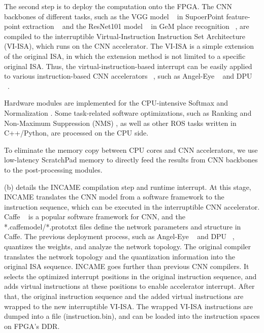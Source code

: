 The second step is to deploy the computation onto the FPGA. 
The CNN backbones of different tasks, such as the VGG model  ~\cite{kim2016accurate} in SupoerPoint feature-point extraction  ~\cite{detone2018superpoint} and the ResNet101 model  ~\cite{he2016deep} in GeM place recognition  ~\cite{radenovic2018fine}, are compiled to the interruptible Virtual-Instruction Instruction Set Architecture (VI-ISA), which runs on the CNN accelerator. The VI-ISA is a simple extension of the original ISA, in which the extension method is not limited to a specific original ISA. Thus, the virtual-instruction-based interrupt can be easily applied to various instruction-based CNN accelerators  ~\cite{yu2018instruction,qiu2016going}, such as Angel-Eye ~\cite{guo2017angel} and DPU ~\cite{dpu}.

Hardware modules are implemented for the CPU-intensive Softmax  \cite{Softmax-wiki} and Normalization  \cite{Norm}. Some task-related software optimizations, such as Ranking and Non-Maximum Suppression (NMS)  \cite{NeubeckGool-NMS}, as well as other ROS tasks written in C++/Python, are processed on the CPU side.

To eliminate the memory copy between CPU cores and CNN accelerators, we use low-latency ScratchPad memory  \cite{Banakar2002Scratchpad} to directly feed the results from CNN backbones to the post-processing modules. 

(b) details the INCAME compilation step and runtime interrupt. At this stage, INCAME translates the CNN model from a software framework to the instruction sequence, which can be executed in the interruptible CNN accelerator. Caffe  ~\cite{jia2014caffe} is a popular software framework for CNN, and the *.caffemodel/*.prototxt files define the network parameters and structure in Caffe. The previous deployment process, such as Angel-Eye  ~\cite{guo2017angel} and DPU ~\cite{dpu}, quantizes the weights, and analyze the network topology. The original compiler translates the network topology and the quantization information into the original ISA sequence. INCAME goes further than previous CNN compilers. It selects the optimized interrupt positions in the original instruction sequence, and adds virtual instructions at these positions to enable accelerator interrupt. After that, the original instruction sequence and the added virtual instructions are wrapped to the new interruptible VI-ISA. The wrapped VI-ISA instructions are dumped into a file (instruction.bin), and can be loaded into the instruction spaces on FPGA's DDR.


